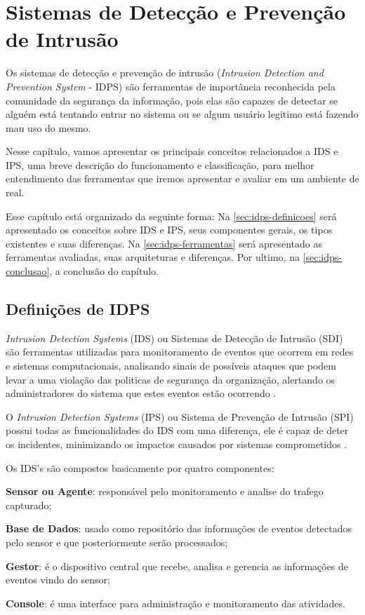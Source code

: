 \chapter{Sistemas de Detecção e Prevenção de Intrusão} \label{ch:idps}

Os sistemas de detecção e prevenção de intrusão (\textit{Intrusion Detection and Prevention System} - IDPS) são ferramentas de importância reconhecida pela comunidade da segurança da informação, pois elas são capazes de detectar se alguém está tentando entrar no sistema ou se algum usuário legitimo está fazendo mau uso do mesmo.

Nesse capítulo, vamos apresentar os principais conceitos relacionados a IDS e IPS, uma breve descrição do funcionamento e classificação, para melhor entendimento das ferramentas que iremos apresentar e avaliar em um ambiente de real.

Esse capítulo está organizado da seguinte forma: Na \autoref{sec:idps-definicoes} será apresentado os conceitos sobre IDS e IPS, seus componentes gerais, os tipos existentes e suas diferenças. Na \autoref{sec:idps-ferramentas} será apresentado as ferramentas avaliadas, suas arquiteturas e diferenças. Por ultimo, na \autoref{sec:idps-conclusao}, a conclusão do capítulo.

\section{Definições de IDPS} \label{sec:idps-definicoes}

\textit{Intrusion Detection Systems} (IDS) ou Sistemas de Detecção de Intrusão (SDI) são ferramentas utilizadas para monitoramento de eventos que ocorrem em redes e sistemas computacionais, analisando sinais de possíveis ataques que podem levar a uma violação das politicas de segurança da organização, alertando os administradores do sistema que estes eventos estão ocorrendo \cite{nagahama2012ipsflow}. 

O \textit{Intrusion Detection Systems} (IPS) ou Sistema de Prevenção de Intrusão (SPI) possui todas as funcionalidades do IDS com uma diferença, ele é capaz de deter os incidentes, minimizando os impactos causados por sistemas comprometidos \cite{mukhopadhyay01}.

Os IDS's são compostos basicamente por quatro componentes:
\begin{alineas}
\item \textbf{Sensor ou Agente}: responsável pelo monitoramento e analise do trafego capturado; 
\item \textbf{Base de Dados}: usado como repositório das informações de eventos detectados pelo sensor e que posteriormente serão processados;
\item \textbf{Gestor}: é o dispositivo central que recebe, analisa e gerencia as informações de eventos vindo do sensor; 
\item \textbf{Console}: é uma interface para administração e monitoramento das atividades.
\end{alineas}

